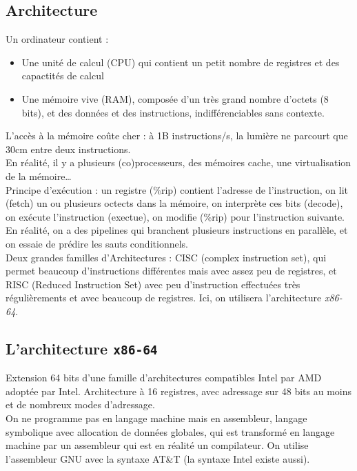 \documentclass{cours}
\begin{document}
\subsection{Architecture}
Un ordinateur contient :
\begin{itemize}
    \item Une unité de calcul (CPU) qui contient un petit nombre de registres et des capactités de calcul
    \item Une mémoire vive (RAM), composée d'un très grand nombre d'octets (8 bits), et des données et des instructions, indifférenciables sans contexte.
\end{itemize}
L'accès à la mémoire coûte cher : à 1B instructions/s, la lumière ne parcourt que 30cm entre deux instructions.\\
En réalité, il y a plusieurs (co)processeurs, des mémoires cache, une virtualisation de la mémoire\ldots\\
Principe d'exécution : un registre (\%rip) contient l'adresse de l'instruction, on lit (fetch) un ou plusieurs octects dans la mémoire, on interprète ces bits (decode), on exécute l'instruction (exectue), on modifie (\%rip) pour l'instruction suivante. En réalité, on a des pipelines qui branchent plusieurs instructions en parallèle, et on essaie de prédire les sauts conditionnels. \\
Deux grandes familles d'Architectures : CISC (complex instruction set), qui permet beaucoup d'instructions différentes mais avec assez peu de registres, et RISC (Reduced Instruction Set) avec peu d'instruction effectuées très régulièrements et avec beaucoup de registres. Ici, on utilisera l'architecture \textit{x86-64}.

\subsection{L'architecture \texttt{x86-64}}
Extension 64 bits d'une famille d'architectures compatibles Intel par AMD adoptée par Intel. Architecture à 16 registres, avec adressage sur 48 bits au moins et de nombreux modes d'adressage. \\
On ne programme pas en langage machine mais en assembleur, langage symbolique avec allocation de données globales, qui est transformé en langage machine par un assembleur qui est en réalité un compilateur. On utilise l'assembleur GNU avec la syntaxe AT\&T (la syntaxe Intel existe aussi).
\end{document}
